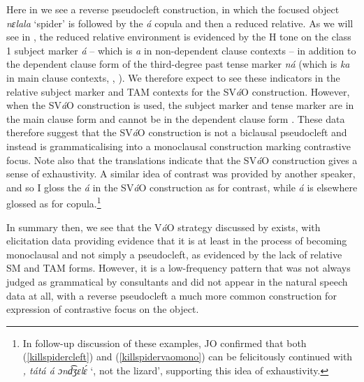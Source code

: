 \documentclass[output=paper,colorlinks,citecolor=brown
]{langscibook}
\begin{document}
Here in  we see a reverse pseudocleft construction, in which the focused object \textit{nɛlala} `spider' is followed by the \textit{á} copula and then a reduced relative. As we will see in , the reduced relative environment is evidenced by the H tone on the class 1 subject marker \textit{á} -- which is \textit{a} in non-dependent clause contexts \citep[§4.3.3.2]{KerrFut} -- in addition to the dependent clause form of the third-degree past tense marker \textit{\ds{}ná} (which is \textit{ka} in main clause contexts, \citealt{Dugast1971, Mous2003}, \citealt[§4.4.5]{KerrFut}). We therefore expect to see these indicators in the relative subject marker and TAM contexts for the SV\textit{á}O construction. However, when the SV\textit{á}O construction is used, the subject marker and tense marker are in the main clause form  and cannot be in the dependent clause form . These data therefore suggest that the SV\textit{á}O construction is not a biclausal pseudocleft and instead is grammaticalising into a monoclausal construction marking contrastive focus. Note also that the translations indicate that the SV\textit{á}O construction gives a sense of exhaustivity. A similar idea of contrast was provided by another speaker, and so I gloss the \textit{á} in the SV\textit{á}O construction as \CONTR{} for contrast, while \textit{á} is elsewhere glossed as \COP{} for copula.\footnote{In follow-up discussion of these examples, JO confirmed that both (\ref{killspidercleft}) and (\ref{killspidervaomono}) can be felicitously continued with \textit{, tátá á ɔnd͡ʒɛlɛ́} `, not the lizard', supporting this idea of exhaustivity.}

In summary then, we see that the V\textit{á}O strategy discussed by \citet{Mous1997, Mous2003} exists, with elicitation data providing evidence that it is at least in the process of becoming monoclausal and not simply a pseudocleft, as evidenced by the lack of relative SM and TAM forms. However, it is a low-frequency pattern that was not always judged as grammatical by consultants  and did not appear in the natural speech data at all, with a reverse pseudocleft a much more common construction for expression of contrastive focus on the object. 
\end{document}
